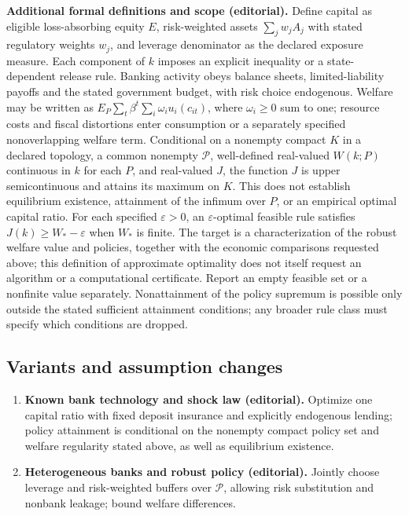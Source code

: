 \documentclass[11pt,a4paper]{article}
\begin{document}
\textbf{Additional formal definitions and scope (editorial).} Define capital as eligible loss-absorbing equity \(E\), risk-weighted assets \(\sum_j w_j A_j\) with stated regulatory weights \(w_j\), and leverage denominator as the declared exposure measure. Each component of \(k\) imposes an explicit inequality or a state-dependent release rule. Banking activity obeys balance sheets, limited-liability payoffs and the stated government budget, with risk choice endogenous. Welfare may be written as \(E_P\sum_t\beta^t\sum_i\omega_i u_i(c_{it})\), where \(\omega_i\geq0\) sum to one; resource costs and fiscal distortions enter consumption or a separately specified nonoverlapping welfare term. Conditional on a nonempty compact \(K\) in a declared topology, a common nonempty \(\mathcal P\), well-defined real-valued \(W(k;P)\) continuous in \(k\) for each \(P\), and real-valued \(J\), the function \(J\) is upper semicontinuous and attains its maximum on \(K\). This does not establish equilibrium existence, attainment of the infimum over \(P\), or an empirical optimal capital ratio. For each specified \(\varepsilon>0\), an \(\varepsilon\)-optimal feasible rule satisfies \(J(k)\geq W_*-\varepsilon\) when \(W_*\) is finite. The target is a characterization of the robust welfare value and policies, together with the economic comparisons requested above; this definition of approximate optimality does not itself request an algorithm or a computational certificate. Report an empty feasible set or a nonfinite value separately. Nonattainment of the policy supremum is possible only outside the stated sufficient attainment conditions; any broader rule class must specify which conditions are dropped.
\subsection*{Variants and assumption changes}
\begin{enumerate}
\item \textbf{Known bank technology and shock law (editorial).} Optimize one capital ratio with fixed deposit insurance and explicitly endogenous lending; policy attainment is conditional on the nonempty compact policy set and welfare regularity stated above, as well as equilibrium existence.
\item \textbf{Heterogeneous banks and robust policy (editorial).} Jointly choose leverage and risk-weighted buffers over \(\mathcal P\), allowing risk substitution and nonbank leakage; bound welfare differences.
\end{enumerate}
\end{document}
